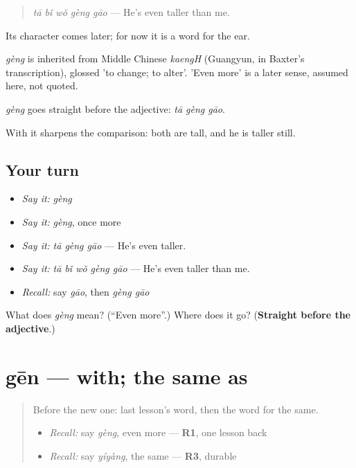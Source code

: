 \begin{quote}
\emph{tā bǐ wǒ gèng gāo} — He's even taller than me.
\end{quote}

Its character comes later; for now it is a word for the ear.

\begin{cousinweb}
\emph{gèng} is inherited from Middle Chinese \emph{kaengH} (Guangyun, in Baxter's transcription), glossed 'to change; to alter'. 'Even more' is a later sense, assumed here, not quoted.
\end{cousinweb}

\begin{grammarlens}[title={What you've built}]
\emph{gèng} goes straight before the adjective: \emph{tā gèng gāo}.

With  it sharpens the comparison: both are tall, and he is taller still.
\end{grammarlens}

\subsection*{Your turn}
\begin{itemize}
\raggedright
  \item \emph{Say it:} \emph{gèng}
  \item \emph{Say it:} \emph{gèng}, once more
  \item \emph{Say it:} \emph{tā gèng gāo} — He's even taller.
  \item \emph{Say it:} \emph{tā bǐ wǒ gèng gāo} — He's even taller than me.
  \item \emph{Recall:} say \emph{gāo}, then \emph{gèng gāo}
\end{itemize}

\begin{tcolorbox}[breakable,colback=teal!4,colframe=teal!35!black,title={Before you move on}]
What does \emph{gèng} mean? (\textquotedblleft{}Even more\textquotedblright{}.) Where does it go? (\textbf{Straight before the adjective}.)
\end{tcolorbox}
\section[gēn]{gēn — with; the same as}

\label{lesson:ZH-C153-gen}



\begin{quote}
Before the new one: last lesson's word, then the word for the same.

\begin{itemize}
\raggedright
  \item \emph{Recall:} say \emph{gèng}, even more — \textbf{R1}, one lesson back
  \item \emph{Recall:} say \emph{yíyàng}, the same — \textbf{R3}, durable
\end{itemize}
\end{quote}

